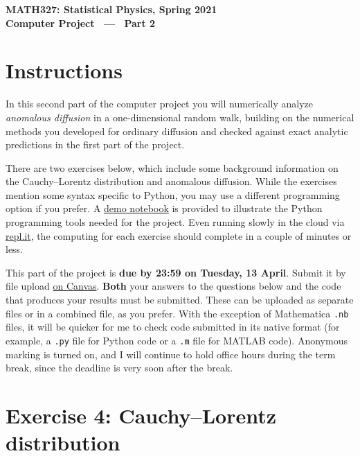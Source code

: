 \documentclass[12 pt]{article} %
\begin{document}
\newcommand{\thisweek}{MATH327 Project Part 2}
\newcommand{\moddate}{Last modified 18 Mar.~2021}
\begin{center}
  {\Large \textbf{MATH327: Statistical Physics, Spring 2021}} \\[12 pt]
  {\Large \textbf{Computer Project \ --- \ Part 2}} \\[24 pt]
\end{center}

\section*{Instructions}
In this second part of the computer project you will numerically analyze \textit{anomalous diffusion} in a one-dimensional random walk, building on the numerical methods you developed for ordinary diffusion and checked against exact analytic predictions in the first part of the project.

There are two exercises below, which include some background information on the Cauchy--Lorentz distribution and anomalous diffusion.
While the exercises mention some syntax specific to Python, you may use a different programming option if you prefer.
A \href{https://tinyurl.com/math327demo}{demo notebook} is provided to illustrate the Python programming tools needed for the project.
Even running slowly in the cloud via \href{https://repl.it}{repl.it}, the computing for each exercise should complete in a couple of minutes or less.

This part of the project is \textbf{due by 23:59 on Tuesday, 13 April}.
Submit it by file upload \href{https://liverpool.instructure.com/courses/19478/assignments/89668}{on Canvas}.
\textbf{Both} your answers to the questions below and the code that produces your results must be submitted.
These can be uploaded as separate files or in a combined file, as you prefer.
With the exception of Mathematica \texttt{.nb} files, it will be quicker for me to check code submitted in its native format (for example, a \texttt{.py} file for Python code or a \texttt{.m} file for MATLAB code).
Anonymous marking is turned on, and I will continue to hold office hours during the term break, since the deadline is very soon after the break.



\section*{Exercise 4: Cauchy--Lorentz distribution}
\end{document}
